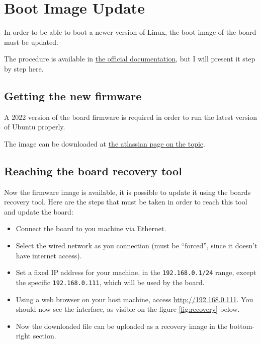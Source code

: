 \documentclass[10pt]{article}
\begin{document}
\pagebreak
\section{Boot Image Update}
\label{sec:boot-image-update}
In order to be able to boot a newer version of Linux, the
boot image of the board must be updated.

The procedure is available in \href{https://docs.xilinx.com/r/en-US/ug1089-kv260-starter-kit/Firmware-Update}{the official documentation},
but I will present it step by step here.

\subsection{Getting the new firmware}
\label{sec:getting-new-firmware}
A 2022 version of the board firmware is required in order to run the latest version of Ubuntu properly.

The image can be downloaded at \href{https://xilinx-wiki.atlassian.net/wiki/spaces/A/pages/1641152513/Kria+K26+SOM#Boot-FW-update-with-xmutil}{the atlassian page on the topic}.

\subsection{Reaching the board recovery tool}
\label{sec:reach-board-recov}
Now the firmware image is available, it is possible to update it using the boards recovery tool.
Here are the steps that must be taken in order to reach this tool and update the board:

\begin{itemize}
\item Connect the board to you machine via Ethernet.
\item Select the wired network as you connection (must be ``forced'', since it doesn't have internet access).
\item Set a fixed IP address for your machine, in the \verb|192.168.0.1/24| range, except the specific \verb|192.168.0.111|, which will be used by the board.
\item Using a web browser on your host machine, access \url{http://192.168.0.111}. You should now see the interface, as visible on the figure \ref{fig:recovery} below.
\item Now the downloaded file can be uploaded as a recovery image in the bottom-right section.
\end{itemize}
\end{document}
